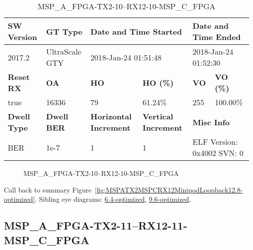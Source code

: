 \begin{table}[h]
\centering
\caption{MSP\_A\_FPGA-TX2-10--RX12-10-MSP\_C\_FPGA}
\label{tab:MSPAFPGATX210RX1210MSPCFPGA12.8-optimized}
\begin{tabular}{@{}|l|l|l|l|l|l|@{}}
\toprule
\textbf{SW Version}                & \textbf{GT Type}   & \multicolumn{2}{l|}{\textbf{Date and Time Started}}            & \multicolumn{2}{l|}{\textbf{Date and Time Ended}}        \\ \midrule
2017.2                       & UltraScale GTY          & \multicolumn{2}{l|}{2018-Jan-24 01:51:48}                   & \multicolumn{2}{l|}{2018-Jan-24 01:52:30}               \\ \midrule
\textbf{Reset RX}                  & \textbf{OA} & \textbf{HO}   & \textbf{HO (\%)} & \textbf{VO} & \textbf{VO (\%)} \\ \midrule
true & 16336        & 79          & 61.24\%        & 255        & 100.00\%       \\ \midrule
\textbf{Dwell Type}                & \textbf{Dwell BER} & \textbf{Horizontal Increment} & \textbf{Vertical Increment}    & \multicolumn{2}{l|}{\textbf{Misc Info}}                  \\ \midrule
BER                            & 1e-7        & 1        & 1           & \multicolumn{2}{l|}{ELF Version: 0x4002 SVN: 0}                         \\ \bottomrule
\end{tabular}
\end{table}

\begin{figure}[h]
\caption{MSP\_A\_FPGA-TX2-10--RX12-10-MSP\_C\_FPGA} \label{fig:MSPAFPGATX210RX1210MSPCFPGA12.8-optimized}
\end{figure}

Call back to summary Figure~\ref{fig:MSPATX2MSPCRX12MinipodLoopback12.8-optimized}.
Sibling eye diagrams: \hyperref[sec:MSPAFPGATX210RX1210MSPCFPGA6.4-optimized]{6.4-optimized}, \hyperref[sec:MSPAFPGATX210RX1210MSPCFPGA9.6-optimized]{9.6-optimized}.

\clearpage
\newpage


\subsection{MSP\_A\_FPGA-TX2-11--RX12-11-MSP\_C\_FPGA}\label{sec:MSPAFPGATX211RX1211MSPCFPGA12.8-optimized}


